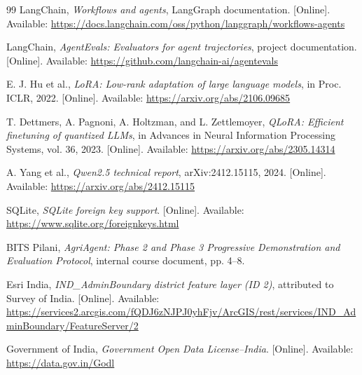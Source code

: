 \begin{thebibliography}{99}
 LangChain, \emph{Workflows and agents}, LangGraph documentation. [Online]. Available: \url{https://docs.langchain.com/oss/python/langgraph/workflows-agents}

 LangChain, \emph{AgentEvals: Evaluators for agent trajectories}, project documentation. [Online]. Available: \url{https://github.com/langchain-ai/agentevals}

 E. J. Hu et al., \emph{LoRA: Low-rank adaptation of large language models}, in Proc. ICLR, 2022. [Online]. Available: \url{https://arxiv.org/abs/2106.09685}

 T. Dettmers, A. Pagnoni, A. Holtzman, and L. Zettlemoyer, \emph{QLoRA: Efficient finetuning of quantized LLMs}, in Advances in Neural Information Processing Systems, vol. 36, 2023. [Online]. Available: \url{https://arxiv.org/abs/2305.14314}

 A. Yang et al., \emph{Qwen2.5 technical report}, arXiv:2412.15115, 2024. [Online]. Available: \url{https://arxiv.org/abs/2412.15115}

 SQLite, \emph{SQLite foreign key support}. [Online]. Available: \url{https://www.sqlite.org/foreignkeys.html}

 BITS Pilani, \emph{AgriAgent: Phase 2 and Phase 3 Progressive Demonstration and Evaluation Protocol}, internal course document, pp. 4--8.

 Esri India, \emph{IND\_AdminBoundary district feature layer (ID 2)}, attributed to Survey of India. [Online]. Available: \url{https://services2.arcgis.com/fQDJ6zNJPJ0yhFjv/ArcGIS/rest/services/IND_AdminBoundary/FeatureServer/2}

 Government of India, \emph{Government Open Data License--India}. [Online]. Available: \url{https://data.gov.in/Godl}
\end{thebibliography}
\endgroup

